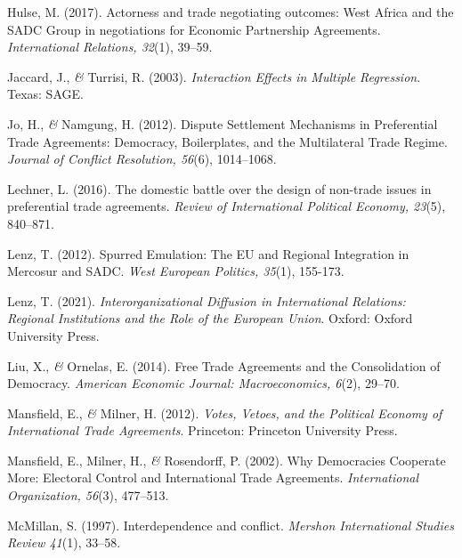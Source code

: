 \documentclass[a4paper]{tufte-handout}
\begin{document}
\begin{list}{}
\item{\small Hulse, M. (2017). Actorness and trade negotiating outcomes: West Africa and the SADC Group in negotiations for Economic Partnership Agreements. {\itshape International Relations, 32}(1), 39--59.}

\item{\small Jaccard, J., {\itshape \&} Turrisi, R. (2003). {\itshape Interaction Effects in Multiple Regression}. Texas: SAGE.}

\item{\small Jo, H., {\itshape \&} Namgung, H. (2012). Dispute Settlement Mechanisms in Preferential Trade Agreements: Democracy, Boilerplates, and the Multilateral Trade Regime. {\itshape Journal of Conflict Resolution, 56}(6), 1014--1068.}

\item{\small Lechner, L. (2016). The domestic battle over the design of non-trade issues in preferential trade agreements. {\itshape Review of International Political Economy, 23}(5), 840--871.}

\item{\small Lenz, T. (2012). Spurred Emulation: The EU and Regional Integration in Mercosur and SADC. {\itshape West European Politics, 35}(1), 155-173.}

\item{\small Lenz, T. (2021). {\itshape Interorganizational Diffusion in International Relations: Regional Institutions and the Role of the European Union}. Oxford: Oxford University Press.}

\item{\small Liu, X., {\itshape \&} Ornelas, E. (2014). Free Trade Agreements and the Consolidation of Democracy. {\itshape American Economic Journal: Macroeconomics, 6}(2), 29--70.}

\item{\small Mansfield, E., {\itshape \&} Milner, H. (2012). {\itshape Votes, Vetoes, and the Political Economy of International Trade Agreements}. Princeton: Princeton University Press.}

\item{\small Mansfield, E., Milner, H., {\itshape \&} Rosendorff, P. (2002). Why Democracies Cooperate More: Electoral Control and International Trade Agreements. {\itshape International Organization, 56}(3), 477--513.}

\item{\small McMillan, S. (1997). Interdependence and conflict. {\itshape Mershon International Studies Review 41}(1), 33--58.}


\end{list}
\end{document}
